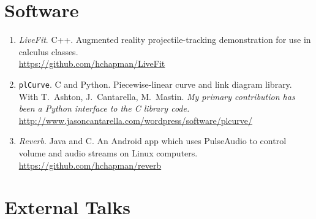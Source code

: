 \documentclass[letterpaper]{article}
\begin{document}
\section*{Software}

\begin{enumerate}
\item \emph{LiveFit}. C++. Augmented reality projectile-tracking demonstration
  for use in calculus classes. \\
  \url{https://github.com/hchapman/LiveFit}
\item \texttt{plCurve}. C and Python. Piecewise-linear curve and link diagram library.\\
  With T.\ Ashton, J.\ Cantarella, M.\ Mastin.
  \textit{My primary contribution has been a Python interface to the C
    library code.} \\
  \url{http://www.jasoncantarella.com/wordpress/software/plcurve/}
\item \emph{Reverb}. Java and C. An Android app which uses PulseAudio to
  control volume and audio streams on Linux computers. \\
  \url{https://github.com/hchapman/reverb}
\end{enumerate}

\section*{External Talks}
\end{document}
